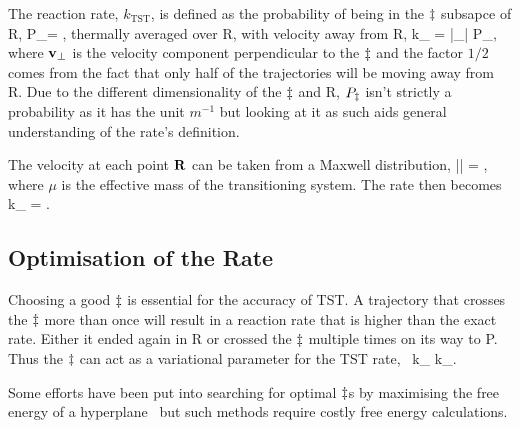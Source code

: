 The reaction rate, $k_\text{TST}$, is defined as the probability of being in the $\ddagger$ subsapce of $\text{R}$,
P_\ts = ,
\eeq
thermally averaged over R, with velocity away from R,\citemiss
{}
k_ = |_\perp| P_\ts,
\eeq
where ${\mathrm{\mathbf{\bm{v}}}}_\perp$ is the velocity component perpendicular to the $\ddagger$ and the factor $1/2$ comes from the fact that only half of the trajectories will be moving away from R.
Due to the different dimensionality of the $\ddagger$ and R, $P_\ddagger$ isn't strictly a probability as it has the unit $\unit{m^{-1}}$ but looking at it as such aids general understanding of the rate's definition.

The velocity at each point ${\mathrm{\mathbf{\bm{R}}}}$ can be taken from a Maxwell distribution,
\langle || \rangle = ,
\eeq
where $\mu$ is the effective mass of the transitioning system.
The rate then becomes
k_ =  .
\eeq

\subsection{Optimisation of the Rate}
Choosing a good $\ddagger$ is essential for the accuracy of TST.
A trajectory that crosses the $\ddagger$ more than once will result in a reaction rate that is higher than the exact rate.
Either it ended again in R or crossed the $\ddagger$ multiple times on its way to P.
Thus the $\ddagger$ can act as a variational parameter for the TST rate,~\cite{vtst-1938, vtst-review-1984, vtst-2005}
k_ \ge k_.
\eeq

\bit
\item Some efforts have been put into searching for optimal $\ddagger$s by maximising the free energy of a hyperplane~\cite{ts-opt-2001} but such methods require costly free energy calculations. 
\eit

